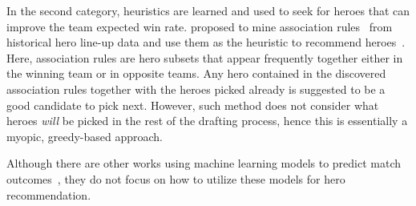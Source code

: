 In the second category, heuristics are learned and used to seek for heroes that can improve the team expected win rate. \citeauthor{hanke2017reco} proposed to mine association rules~\cite{agrawal1994fast} from historical hero line-up data and use them as the heuristic to recommend heroes~\cite{hanke2017reco}. Here, association rules are hero subsets that appear frequently together either in the winning team or in opposite teams. Any hero contained in the discovered association rules together with the heroes picked already is suggested to be a good candidate to pick next. However, such method does not consider what heroes \textit{will} be picked in the rest of the drafting process, hence this is essentially a myopic, greedy-based approach.
  
Although there are other works using machine learning models to predict match outcomes~\cite{Yang:identifying,Semenov2016}, they do not focus on how to utilize these models for hero recommendation.






